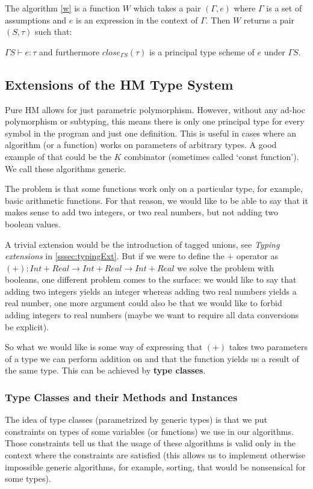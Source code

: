 The algorithm \ref{w} is a function $W$ which takes a pair $(\Gamma, e)$ where $\Gamma$ is a set of assumptions and $e$ is an expression in the context of $\Gamma$. Then $W$ returns a pair $(S, \tau)$ such that:

$\Gamma S \vdash e : \tau$ and furthermore $close_{\Gamma S}(\tau)$ is a principal type scheme of $e$ under $\Gamma S$.

\subsection{Extensions of the HM Type System}

Pure HM allows for just parametric polymorphism. However, without any ad-hoc polymorphism or subtyping, this means there is only one principal type for every symbol in the program and just one definition. This is useful in cases where an algorithm (or a function) works on parameters of arbitrary types. A good example of that could be the $K$ combinator (sometimes called `const function'). We call these algorithms generic.

The problem is that some functions work only on a particular type, for example, basic arithmetic functions. For that reason, we would like to be able to say that it makes sense to add two integers, or two real numbers, but not adding two boolean values.

A trivial extension would be the introduction of tagged unions, see \emph{Typing extensions} in \ref{sssec:typingExt}. But if we were to define the $+$ operator as $(+) : Int + Real \rightarrow Int + Real \rightarrow Int + Real$ we solve the problem with booleans, one different problem comes to the surface: we would like to say that adding two integers yields an integer whereas adding two real numbers yields a real number, one more argument could also be that we would like to forbid adding integers to real numbers (maybe we want to require all data conversions be explicit).

So what we would like is some way of expressing that $(+)$ takes two parameters of a type we can perform addition on and that the function yields us a result of the same type. This can be achieved by \textbf{type classes}.

\subsubsection{Type Classes and their Methods and Instances}

The idea of type classes (parametrized by generic types) is that we put constraints on types of some variables (or functions) we use in our algorithms. Those constraints tell us that the usage of these algorithms is valid only in the context where the constraints are satisfied (this allows us to implement otherwise impossible generic algorithms, for example, sorting, that would be nonsensical for some types).

